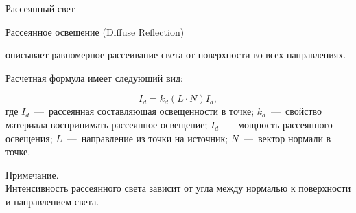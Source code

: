 \documentclass{beamer}
\begin{document}
	\begin{frame}{Рассеянный свет}	

		Рассеянное освещение (Diffuse Reflection)
		
		описывает равномерное рассеивание света от поверхности во всех направлениях.

		Расчетная формула имеет следующий вид:
		
		\[
			I_d %
			= k_d (L \cdot N) I_d
			,	
		\]
		где 
		$I_d$~---~рассеянная составляющая освещенности в точке;
		$k_d$~---~свойство материала воспринимать рассеянное освещение;
		$I_d$~---~мощность рассеянного освещения;
		$L$~---~направление из точки на источник;
		$N$~---~вектор нормали в точке.
	
		\footnotesize
		Примечание.\\ 
		Интенсивность рассеянного света зависит от угла между нормалью к поверхности и направлением света.
		

	\end{frame}


		
\end{document}
